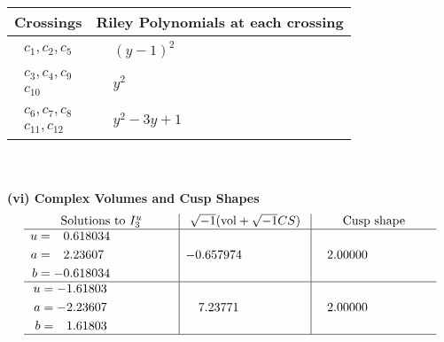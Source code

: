 \documentclass[1p]{elsarticle_modified}
\theoremstyle{definition}
\newcommand{\I}{\sqrt{-1}}
\begin{document}
\begin{tabular}{m{50pt}|m{274pt}}
Crossings & \hspace{64pt}Riley Polynomials at each crossing \\
\hline $$\begin{aligned}c_{1},c_{2},c_{5}\end{aligned}$$&$\begin{aligned}
&(y-1)^2
\end{aligned}$\\
\hline $$\begin{aligned}c_{3},c_{4},c_{9}\\c_{10}\end{aligned}$$&$\begin{aligned}
&y^2
\end{aligned}$\\
\hline $$\begin{aligned}c_{6},c_{7},c_{8}\\c_{11},c_{12}\end{aligned}$$&$\begin{aligned}
&y^2-3 y+1
\end{aligned}$\\
\hline
\end{tabular}\\~\\
\newpage\flushleft \textbf{(vi) Complex Volumes and Cusp Shapes}
$$\begin{array}{c|c|c}  
\text{Solutions to }I^u_{3}& \I (\text{vol} + \sqrt{-1}CS) & \text{Cusp shape}\\
 \hline 
\begin{aligned}
u &= \phantom{-}0.618034\phantom{ +0.000000I} \\
a &= \phantom{-}2.23607\phantom{ +0.000000I} \\
b &= -0.618034\phantom{ +0.000000I}\end{aligned}
 & -0.657974\phantom{ +0.000000I} & \phantom{-}2.00000\phantom{ +0.000000I} \\ \hline\begin{aligned}
u &= -1.61803\phantom{ +0.000000I} \\
a &= -2.23607\phantom{ +0.000000I} \\
b &= \phantom{-}1.61803\phantom{ +0.000000I}\end{aligned}
 & \phantom{-}7.23771\phantom{ +0.000000I} & \phantom{-}2.00000\phantom{ +0.000000I}\\
 \hline 
 \end{array}$$\newpage
\newpage\renewcommand{\arraystretch}{1}
\end{document}
